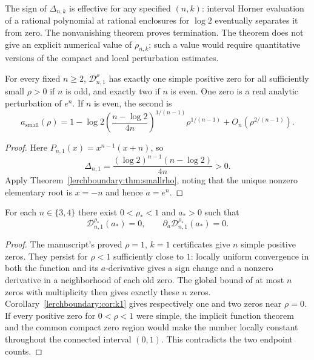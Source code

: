 The sign of $\Delta_{n,k}$ is effective for any specified $(n,k)$:
interval Horner evaluation of a rational polynomial at rational
enclosures for $\log2$ eventually separates it from zero.  The
nonvanishing theorem proves termination.  The theorem does not give
an explicit numerical value of $\rho_{n,k}$; such a value would require
quantitative versions of the compact and local perturbation estimates.

\begin{corollary}
\label{lerchboundary:cor:k1}
For every fixed $n\geq2$, $\mathcal D_{n,1}^{\rho}$ has exactly one
simple positive zero for all sufficiently small $\rho>0$ if $n$ is
odd, and exactly two if $n$ is even.  One zero is a real analytic
perturbation of $e^n$.  If $n$ is even, the second is
\begin{equation}\label{lerchboundary:eq:k1small}
 a_{\mathrm{small}}(\rho)
 =1-\log2\left(\frac{n-\log2}{4n}\right)^{1/(n-1)}
      \rho^{1/(n-1)}+O_n(\rho^{2/(n-1)}).
\end{equation}
\end{corollary}

\begin{proof}
Here $P_{n,1}(x)=x^{n-1}(x+n)$, so
\[
 \Delta_{n,1}=
   \frac{(\log2)^{n-1}(n-\log2)}{4n}>0.
\]
Apply Theorem~\ref{lerchboundary:thm:smallrho}, noting that the unique
nonzero elementary root is $x=-n$ and hence $a=e^n$.
\end{proof}

\begin{corollary}
\label{lerchboundary:cor:degeneracy}
For each $n\in\{3,4\}$ there exist $0<\rho_*<1$ and $a_*>0$ such that
\[
 \mathcal D_{n,1}^{\rho_*}(a_*)=0,
 \qquad \partial_a\mathcal D_{n,1}^{\rho_*}(a_*)=0.
\]
\end{corollary}

\begin{proof}
The manuscript's proved $\rho=1$, $k=1$ certificates give $n$ simple
positive zeros.  They persist for $\rho<1$ sufficiently close to $1$:
locally uniform convergence in both the function and its $a$-derivative
gives a sign change and a nonzero derivative in a neighborhood of each
old zero. The global bound of at most $n$ zeros with multiplicity then
gives exactly these $n$ zeros.
Corollary~\ref{lerchboundary:cor:k1} gives respectively one and two
zeros near $\rho=0$. If every positive zero for $0<\rho<1$ were simple,
the implicit function theorem and the common compact zero region would
make the number locally constant throughout the connected interval
$(0,1)$. This contradicts the two endpoint counts.
\end{proof}


